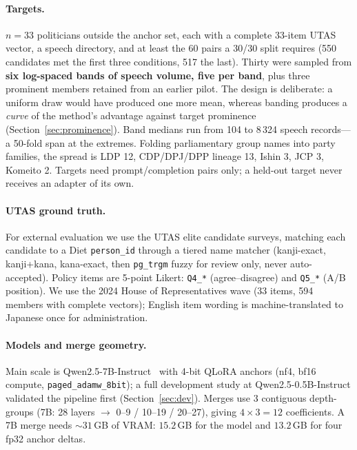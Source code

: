 \documentclass[11pt,letterpaper]{article}
\begin{document}
\paragraph{Targets.} $n=33$ politicians outside the anchor set, each with a complete 33-item UTAS vector, a speech directory, and at least the 60 pairs a 30/30 split requires (550 candidates met the first three conditions, 517 the last). Thirty were sampled from \textbf{six log-spaced bands of speech volume, five per band}, plus three prominent members retained from an earlier pilot. The design is deliberate: a uniform draw would have produced one more mean, whereas banding produces a \emph{curve} of the method's advantage against target prominence (Section~\ref{sec:prominence}). Band medians run from 104 to 8\,324 speech records---a 50-fold span at the extremes. Folding parliamentary group names into party families, the spread is LDP 12, CDP/DPJ/DPP lineage 13, Ishin 3, JCP 3, Komeito 2. Targets need prompt/completion pairs only; a held-out target never receives an adapter of its own.

\paragraph{UTAS ground truth.} For external evaluation we use the UTAS elite candidate surveys, matching each candidate to a Diet \texttt{person\_id} through a tiered name matcher (kanji-exact, kanji+kana, kana-exact, then \texttt{pg\_trgm} fuzzy for review only, never auto-accepted). Policy items are 5-point Likert: \texttt{Q4\_*} (agree--disagree) and \texttt{Q5\_*} (A/B position). We use the 2024 House of Representatives wave (33 items, 594 members with complete vectors); English item wording is machine-translated to Japanese once for administration.

\paragraph{Models and merge geometry.} Main scale is Qwen2.5-7B-Instruct~\cite{qwen2025qwen25} with 4-bit QLoRA anchors (nf4, bf16 compute, \texttt{paged\_adamw\_8bit}); a full development study at Qwen2.5-0.5B-Instruct validated the pipeline first (Section~\ref{sec:dev}). Merges use 3 contiguous depth-groups (7B: 28 layers $\rightarrow$ 0--9 / 10--19 / 20--27), giving $4\times3=12$ coefficients. A 7B merge needs ${\sim}31$\,GB of VRAM: $15.2$\,GB for the model and $13.2$\,GB for four fp32 anchor deltas.
\end{document}
